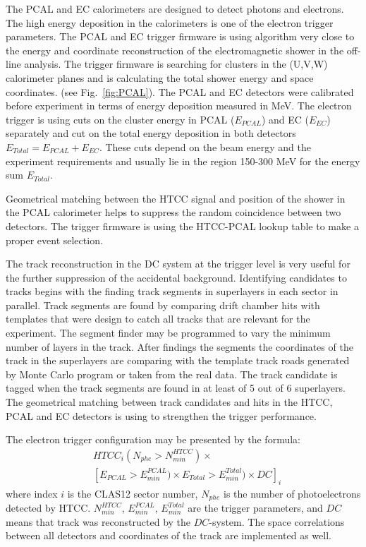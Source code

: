 The PCAL and EC calorimeters are designed to detect photons and electrons. The high energy deposition in the calorimeters is one of the electron trigger parameters.
 The PCAL and EC  trigger firmware is using algorithm very close to the energy and coordinate reconstruction of the electromagnetic shower in the  off-line analysis. 
The trigger firmware is searching  for clusters in the (U,V,W) calorimeter planes and is calculating the total shower energy
and space coordinates. (see Fig.~\ref{fig:PCAL}).
The PCAL and EC detectors were calibrated before experiment in terms of energy deposition measured in MeV.
The electron trigger is using cuts on the cluster energy  in PCAL ($E_{PCAL}$) and EC ($E_{EC}$) separately and cut on the total energy deposition in both detectors $E_{Total}=E_{PCAL}+E_{EC}$.
These cuts   depend  on the beam energy and the experiment requirements and usually lie in the region 150-300 MeV for the energy sum $E_{Total}$.

Geometrical matching between the HTCC signal and position of the shower in the PCAL calorimeter helps to suppress the
random coincidence between two detectors. The trigger firmware is using the HTCC-PCAL lookup table to make a proper event selection.   

The track reconstruction in the DC system at the trigger level is very useful for the further suppression of the accidental background. 
Identifying candidates to tracks begins with  the finding track segments in superlayers in each sector in parallel. Track segments are found by comparing drift chamber hits with templates that were design to catch all tracks that are relevant for the experiment.
The segment finder may be programmed to vary the minimum number of layers in the track.  After findings the  segments the
coordinates of the track  in the superlayers are  comparing with the template track roads generated by Monte Carlo program or taken from the real data. The track candidate is tagged when the track segments are found in at least of 5  out of 6 superlayers.
The geometrical matching between track candidates and hits in the HTCC,  PCAL and EC detectors is using to strengthen the trigger performance.

The electron trigger configuration may be presented by the formula:
\begin{align*} 
 &HTCC_i(N_{phe}{>}N^{HTCC}_{min})\times\\
 & [E_{PCAL}{>}E^{PCAL}_{min})\times E_{Total}{>}E^{Total}_{min})\times  DC]_i
\end{align*}
\noindent
where index $i$ is the CLAS12 sector number, $N_{phe}$ is the number of photoelectrons detected by HTCC.  $N^{HTCC}_{min}$, 
$E^{PCAL}_{min}$, $ E^{Total}_{min}$ are the trigger parameters, and $DC$ means that  track was reconstructed by the $DC$-system. The space correlations between all detectors and coordinates of the track are implemented as well.


